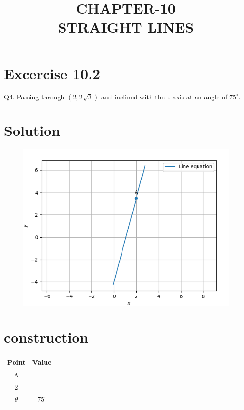\documentclass[journal,10pt,twocolumn]{article}
\title{\textbf{CHAPTER-10 \\ STRAIGHT LINES}}
\newcommand{\myvec}[1]{\ensuremath{\begin{pmatrix}#1\end{pmatrix}}}
\begin{document}
\maketitle
\section*{Excercise 10.2}

Q4. Passing through $(2,2\sqrt{3})$ and inclined with the x-axis at an angle of $75^\circ$.

\section*{\large Solution}

\begin{figure}[H]
\centering
\includegraphics[width=1\columnwidth]{./figs/line.png}	
\caption{}
\end{figure}


\section{construction}

\begin{tabular}{|c|c|}
	\hline
	\textbf{Point}&\textbf{Value}\\
	\hline
	A&\myvec{2\\2\sqrt{3}}\\
	\hline
	$\theta$&75$^\circ$\\
	\hline
	
	
\end{tabular}
\end{document}
